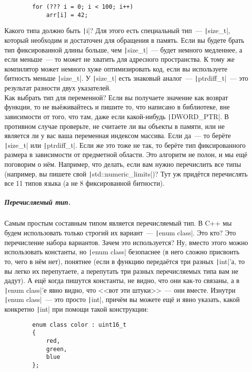 \documentclass{article}
\begin{document}
    \begin{verbatim}
        for (??? i = 0; i < 100; i++)
            arr[i] = 42;
    \end{verbatim}
    Какого типа должно быть \texttt|i|? Для этого есть специальный тип~--- \texttt|size_t|, который необходим и достаточен для обращения в память. Если вы будете брать тип фиксированной длины больше, чем \texttt|size_t|~--- будет немного медленнее, а если меньше~--- то может не хватить для адресного пространства. К тому же компилятор может немного хуже оптимизировать код, если вы используете битность меньше \texttt|size_t|. У \texttt|size_t| есть знаковый аналог~--- \texttt|ptrdiff_t|~--- это результат разности двух указателей.\\
    Как выбрать тип для переменной? Если вы получаете значение как возврат функции, то не выёживайтесь и пишите то, что написано в библиотеке, вне зависимости от того, что там, даже если какой-нибудь \texttt|DWORD_PTR|. В противном случае проверьте, не считаете ли вы объекты в памяти, или не является ли у вас ваша переменная индексом массива. Если да~--- то берёте \texttt|size_t| или \texttt|ptrdiff_t|. Если же это тоже не так, то берёте тип фиксированного размера в зависимости от предметной области. Это алгоритм не полон, и мы ещё поговорим о нём. Например, что делать, если вам нужно перечислить все типы (например, вы пишете свой \texttt|std::numeric_limits|)? Тут уж придётся перечислять все 11 типов языка (а не 8 фиксированной битности).
    \subparagraph{Перечисляемый тип.}
    Самым простым составным типом является перечисляемый тип. В C++ мы будем использовать только строгий их вариант~--- \texttt|enum class|. Это кто? Это перечисление набора вариантов. Зачем это используется? Ну, вместо этого можно использовать константы, но \texttt|enum class| безопаснее (в него сложно присвоить то, чего в нём нет), понятнее (если в функцию передаётся три разных \texttt|int|'а, то вы легко их перепутаете, а перепутать три разных перечисляемых типа вам не дадут). А ещё когда пишутся константы, не видно, что они как-то связаны, а в \texttt|enum class|'е явно видно, что <<вот эти штуки>>~--- они вместе. Изнутри \texttt|enum class|~--- это просто \texttt|int|, причём вы можете ещё и явно указать, какой конкретно \texttt|int| при помощи такой конструкции:
    \begin{verbatim}
        enum class color : uint16_t
        {
            red,
            green,
            blue
        };
    \end{verbatim}
\end{document}
